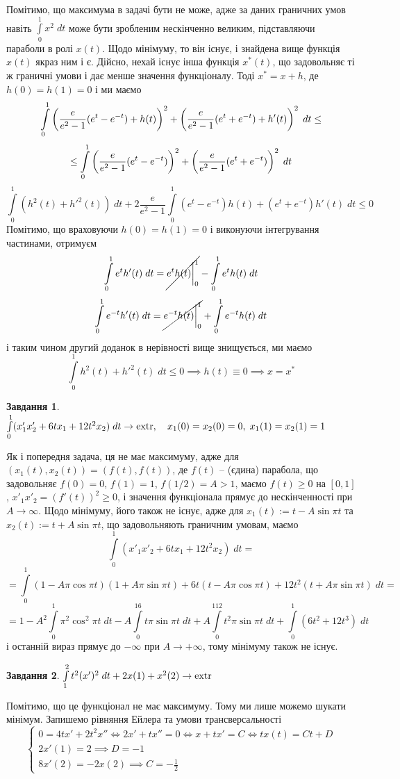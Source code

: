 \documentclass[12pt]{article} %
\newtheorem{prob}{Завдання}
\newcommand{\dt}{\;dt}
\let\oldint\int
\renewcommand{\int}{\oldint\limits}
\newcommand{\extr}{\mbox{\normalfont extr}}
\begin{document}
Помітимо, що максимума в задачі бути не може, адже за даних граничних умов навіть $\int_0^1x^2\dt$ може бути зробленим нескінченно
великим, підставляючи параболи в ролі $x(t)$. Щодо мінімуму, то він існує, і знайдена вище функція $x(t)$ якраз ним і є. Дійсно, нехай
існує інша функція $x^*(t)$, що задовольняє ті ж граничні умови і дає менше значення функціоналу. Тоді $x^*=x+h$, де $h(0)=h(1)=0$ і ми маємо
\[\int_0^1\mybra{\frac{e}{e^2-1}(e^t-e^{-t})+h(t)}^2+\mybra{\frac{e}{e^2-1}(e^t+e^{-t})+h'(t)}^2\dt\leq\]
\[\leq\int_0^1\mybra{\frac{e}{e^2-1}(e^t-e^{-t})}^2+\mybra{\frac{e}{e^2-1}(e^t+e^{-t})}^2\dt\]
\[\int_0^1(h^2(t)+h'^2(t))\dt+2\frac{e}{e^2-1}\int_0^1(e^t-e^{-t})h(t)+(e^t+e^{-t})h'(t)\dt\leq0\]
Помітимо, що враховуючи $h(0)=h(1)=0$ і виконуючи інтегрування частинами, отримуєм
\[\int_0^1e^th'(t)\dt=\cancel{e^th(t)\bigg|_0^1}-\int_0^1e^th(t)\dt\]
\[\int_0^1e^{-t}h'(t)\dt=\cancel{e^{-t}h(t)\bigg|_0^1}+\int_0^1e^{-t}h(t)\dt\]
і таким чином другий доданок в нерівності вище знищується, ми маємо
\[\int_0^1h^2(t)+h'^2(t)\dt\leq0\implies h(t)\equiv0\implies x=x^*\]
\begin{prob}{}\; $\int_0^1(x'_1x'_2+6tx_1+12t^2x_2)\dt\to\extr,\quad x_1(0)=x_2(0)=0,\;x_1(1)=x_2(1)=1$
\end{prob}
Як і попередня задача, ця не має максимуму, адже для $(x_1(t),x_2(t))=(f(t),f(t))$, де $f(t)$ -- (єдина) парабола, що задовольняє 
$f(0)=0$, $f(1)=1$, $f(1/2)=A>1$, маємо $f(t)\geq0$ на $[0,1]$, $x'_1x'_2=(f'(t))^2\geq0$, і значення функціонала прямує до нескінченності при
$A\to\infty$. Щодо мінімуму, його також не існує, адже для $x_1(t):=t-A\sin\pi t$ та $x_2(t):=t+A\sin\pi t$, що задовольняють граничним
умовам, маємо
\[\int_0^1(x'_1x'_2+6tx_1+12t^2x_2)\dt=\]
\[=\int_0^1(1-A\pi\cos\pi t)(1+A\pi\sin\pi t)+6t(t-A\pi\cos\pi t)+12t^2(t+A\pi\sin\pi t)\dt=\]
\[=1-A^2\int_0^1\pi^2\cos^2\pi t\dt-A\int_0^16t\pi\sin\pi t\dt+A\int_0^112t^2\pi\sin\pi t\dt+\int_0^1(6t^2+12t^3)\dt\]
і останній вираз прямує до $-\infty$ при $A\to+\infty$, тому мінімуму також не існує.
\begin{prob}{}\; $\int_1^2t^2(x')^2\dt+2x(1)+x^2(2)\to\extr$
\end{prob}
Помітимо, що це функціонал не має максимуму. Тому ми лише можемо шукати мінімум.
Запишемо рівняння Ейлера та умови трансверсальності
\[\begin{cases}
	0=4tx'+2t^2x''\iff 2x'+tx''=0\iff x+tx'=C\iff tx(t)=Ct+D\\
	2x'(1)=2\implies D=-1\\
	8x'(2)=-2x(2)\implies C=-\frac{1}{2}
\end{cases}\]
\end{document}
